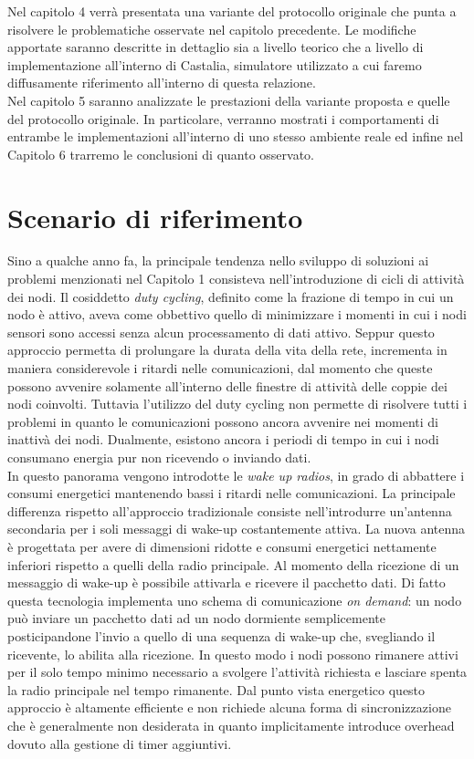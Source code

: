 \documentclass[binding=0.6cm,TFA]{sapthesis}
\begin{document}
Nel capitolo 4 verrà presentata una variante del protocollo originale che punta a risolvere le problematiche osservate nel capitolo precedente. Le
modifiche apportate saranno descritte in dettaglio sia a livello teorico che a livello di implementazione all'interno di Castalia,
simulatore utilizzato a cui faremo diffusamente riferimento all'interno di questa relazione.\\

Nel capitolo 5 saranno analizzate le prestazioni della variante proposta e quelle del protocollo originale. In particolare, verranno mostrati i
comportamenti di entrambe le implementazioni all'interno di uno stesso ambiente reale ed infine nel Capitolo 6 trarremo le conclusioni di quanto osservato.


\chapter{Scenario di riferimento}

Sino a qualche anno fa, la principale tendenza nello sviluppo di soluzioni ai problemi menzionati nel Capitolo 1 consisteva nell'introduzione di cicli di attività
dei nodi. Il cosiddetto \emph{duty cycling}, definito come la frazione di tempo in cui un nodo è attivo, aveva come obbettivo quello di minimizzare i momenti
in cui i nodi sensori sono accessi senza alcun processamento di dati attivo. Seppur questo approccio permetta di prolungare la durata della vita della rete,
incrementa in maniera considerevole i ritardi nelle comunicazioni, dal momento che queste possono avvenire solamente all'interno delle finestre di attività
delle coppie dei nodi coinvolti. Tuttavia l'utilizzo del duty cycling non permette di risolvere tutti i problemi in quanto le comunicazioni possono ancora
avvenire nei momenti di inattivà dei nodi. Dualmente, esistono ancora i periodi di tempo in cui i nodi consumano energia pur non ricevendo o inviando dati.\\


In questo panorama vengono introdotte le \emph{wake up radios}, in grado di abbattere i consumi energetici mantenendo bassi i ritardi nelle comunicazioni.
La principale differenza rispetto all'approccio tradizionale consiste nell'introdurre un'antenna secondaria per i soli messaggi di wake-up costantemente
attiva. La nuova antenna è progettata per avere di dimensioni ridotte e consumi energetici nettamente inferiori rispetto a quelli della radio principale.
Al momento della ricezione di un messaggio di wake-up è possibile attivarla e ricevere il pacchetto dati. Di fatto questa tecnologia implementa uno schema
di comunicazione \emph{on demand}: un nodo può inviare un pacchetto dati ad un nodo dormiente semplicemente  posticipandone l'invio a quello di una sequenza
di wake-up che, svegliando il ricevente, lo abilita alla ricezione. In questo modo i nodi possono rimanere attivi per il solo tempo minimo necessario a
svolgere l'attività richiesta e lasciare spenta la radio principale nel tempo rimanente. Dal punto vista energetico questo approccio è altamente efficiente
e non richiede alcuna forma di sincronizzazione che è generalmente non desiderata in quanto implicitamente introduce overhead dovuto alla gestione di timer
aggiuntivi.\\
\end{document}
